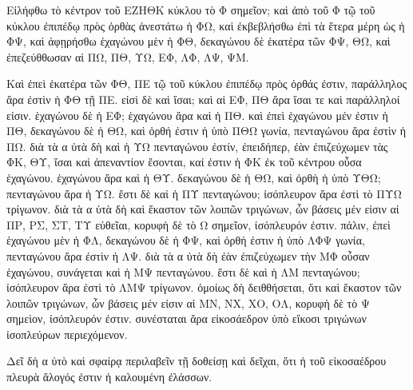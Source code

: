 \begin{Parallel}{}{}
{\epsfysize=3.5in
\centerline{}

{\greekfont Εἰλήφθω
τὸ κέντρον τοῦ ΕΖΗΘΚ κύκλου τὸ Φ σημεῖον; καὶ ἀπὸ
τοῦ Φ τῷ τοῦ κύκλου ἐπιπέδῳ πρὸς ὀρθὰς
ἀνεστάτω ἡ ΦΩ, καὶ ἐκβεβλήσθω ἐπὶ τὰ
ἕτερα μέρη ὡς ἡ ΦΨ, καὶ ἀφῃρήσθω ἑχαγώνου μὲν
ἡ ΦΘ, δεκαγώνου δὲ ἑκατέρα τῶν ΦΨ, ΘΩ, καὶ ἐπεζεύθθωσαν αἱ ΠΩ, ΠΘ, ΥΩ, ΕΦ, ΛΦ, ΛΨ,
ΨΜ.}

{\greekfont Καὶ ἐπεὶ ἑκατέρα τῶν ΦΘ, ΠΕ τῷ τοῦ κύκλου
ἐπιπέδῳ πρὸς ὀρθάς ἐστιν, παράλληλος ἄρα ἐστὶν
ἡ ΦΘ τῇ ΠΕ. εἰσὶ δὲ καὶ ἴσαι; καὶ αἱ ΕΦ, ΠΘ
ἄρα ἴσαι τε καὶ παράλληλοί εἰσιν. ἑχαγώνου δὲ ἡ ΕΦ; 
ἑχαγώνου ἄρα καὶ ἡ ΠΘ. καὶ ἐπεὶ ἑχαγώνου
μέν ἐστιν ἡ ΠΘ, δεκαγώνου δὲ ἡ ΘΩ, καὶ ὀρθή ἐστιν
ἡ ὑπὸ ΠΘΩ γωνία, πενταγώνου ἄρα ἐστὶν ἡ ΠΩ.
διὰ τὰ α ὐτὰ δὴ καὶ ἡ ΥΩ πενταγώνου ἐστίν, ἐπειδήπερ,
ἐὰν ἐπιζεύχωμεν τὰς ΦΚ, ΘΥ, ἴσαι καὶ ἀπεναντίον
ἔσονται, καί ἐστιν ἡ ΦΚ ἐκ τοῦ κέντρου οὖσα
ἑχαγώνου.  ἑχαγώνου ἄρα καὶ ἡ ΘΥ. δεκαγώνου
δὲ ἡ ΘΩ, καὶ ὀρθὴ ἡ ὑπὸ ΥΘΩ; πενταγώνου
ἄρα ἡ ΥΩ. ἔστι δὲ καὶ ἡ ΠΥ πενταγώνου; ἰσόπλευρον ἄρα
ἐστὶ τὸ ΠΥΩ τρίγωνον. διὰ τὰ α ὐτὰ δὴ καὶ ἕκαστον
τῶν λοιπῶν τριγώνων, ὧν βάσεις μέν εἰσιν αἱ ΠΡ, ΡΣ,
ΣΤ, ΤΥ εὐθεῖαι, κορυφὴ δὲ τὸ Ω σημεῖον,  ἰσόπλευρόν
ἐστιν. πάλιν, ἐπεὶ ἑχαγώνου μὲν ἡ ΦΛ, δεκαγώνου
δὲ ἡ ΦΨ, καὶ ὀρθή ἐστιν ἡ ὑπὸ ΛΦΨ γωνία, πενταγώνου
ἄρα ἐστὶν ἡ ΛΨ. διὰ τὰ α ὐτὰ δὴ ἐὰν ἐπιζεύχωμεν τὴν
ΜΦ οὖσαν ἑχαγώνου, συνάγεται καὶ ἡ ΜΨ πενταγώνου.
ἔστι δὲ καὶ ἡ ΛΜ πενταγώνου; ἰσόπλευρον ἄρα ἐστὶ τὸ
ΛΜΨ τρίγωνον. ὁμοίως δὴ δειθθήσεται, ὅτι καὶ ἕκαστον
τῶν λοιπῶν τριγώνων, ὧν βάσεις μέν εἰσιν αἱ ΜΝ,
ΝΧ, ΧΟ, ΟΛ, κορυφὴ δὲ τὸ Ψ σημεὶον, ἰσόπλευρόν
ἐστιν. συνέσταται ἄρα εἰκοσάεδρον ὑπὸ εἴκοσι τριγώνων
ἰσοπλεύρων περιεχόμενον.}

{\greekfont Δεῖ δὴ α ὐτὸ καὶ σφαίρᾳ περιλαβεῖν τῇ δοθείσῃ
καὶ δεῖχαι, ὅτι ἡ τοῦ εἰκοσαέδρου πλευρὰ ἄλογός
ἐστιν ἡ καλουμένη ἐλάσσων.}

}
\end{Parallel}
